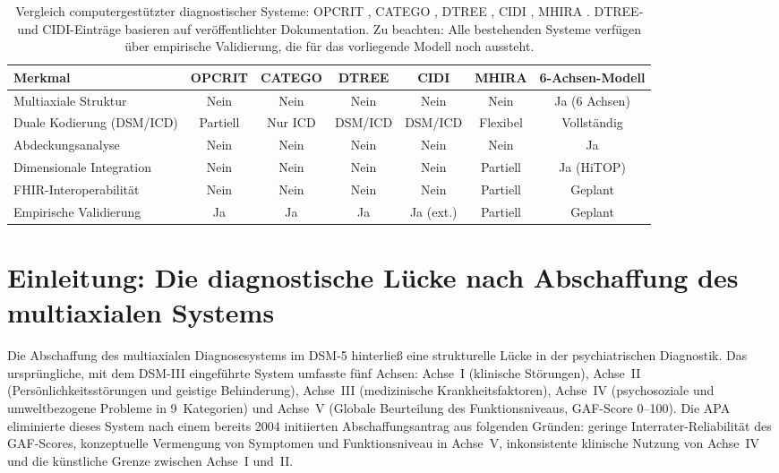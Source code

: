 \documentclass[11pt,a4paper]{article}
\begin{document}
\begin{table}[ht]
\centering
\caption{Vergleich computergest\"utzter diagnostischer Systeme: OPCRIT \citep{McGuffin1991}, CATEGO \citep{Wing1974}, DTREE \citep{First1993}, CIDI \citep{Kessler2004}, MHIRA \citep{Stasiak2023}. DTREE- und CIDI-Eintr\"age basieren auf ver\"offentlichter Dokumentation. Zu beachten: Alle bestehenden Systeme verf\"ugen \"uber empirische Validierung, die f\"ur das vorliegende Modell noch aussteht.}
\begin{tabular}{lcccccc}
\toprule
Merkmal & OPCRIT & CATEGO & DTREE & CIDI & MHIRA & 6-Achsen-Modell \\
\midrule
Multiaxiale Struktur & Nein & Nein & Nein & Nein & Nein & Ja (6 Achsen) \\
Duale Kodierung (DSM/ICD) & Partiell & Nur ICD & DSM/ICD & DSM/ICD & Flexibel & Vollst\"andig \\
Abdeckungsanalyse & Nein & Nein & Nein & Nein & Nein & Ja \\
Dimensionale Integration & Nein & Nein & Nein & Nein & Partiell & Ja (HiTOP) \\
FHIR-Interoperabilit\"at & Nein & Nein & Nein & Nein & Partiell & Geplant \\
Empirische Validierung & Ja & Ja & Ja & Ja (ext.) & Partiell & Geplant \\
\bottomrule
\end{tabular}
\label{tab:vergleich}
\end{table}

\newpage


\section{Einleitung: Die diagnostische L\"ucke nach Abschaffung des multiaxialen Systems}
\label{sec:einleitung}

Die Abschaffung des multiaxialen Diagnosesystems im DSM-5 \citep{APA2013} hinterlie\ss{} eine strukturelle L\"ucke in der psychiatrischen Diagnostik. Das urspr\"ungliche, mit dem DSM-III \citep{APA1980DSM3} eingef\"uhrte System umfasste f\"unf Achsen: Achse~I (klinische St\"orungen), Achse~II (Pers\"onlichkeitsst\"orungen und geistige Behinderung), Achse~III (medizinische Krankheitsfaktoren), Achse~IV (psychosoziale und umweltbezogene Probleme in 9~Kategorien) und Achse~V (Globale Beurteilung des Funktionsniveaus, GAF-Score 0--100). Die APA eliminierte dieses System nach einem bereits 2004 initiierten Abschaffungsantrag aus folgenden Gr\"unden: geringe Interrater-Reliabilit\"at des GAF-Scores, konzeptuelle Vermengung von Symptomen und Funktionsniveau in Achse~V, inkonsistente klinische Nutzung von Achse~IV und die k\"unstliche Grenze zwischen Achse~I und~II.
\end{document}
